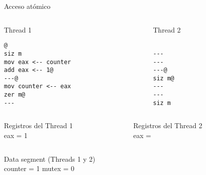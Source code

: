 \begin{frame}[fragile]{Acceso at\'omico}
   \begin{columns}
      \begin{column}{.5\linewidth}
          Thread 1
         \begin{lstlisting}[style=dimmided42,firstnumber=0]
         @
siz m
mov eax <-- counter
add eax <-- 1@
---@
mov counter <-- eax
zer m@
---
         \end{lstlisting}
      \end{column}
      \begin{column}{.45\linewidth}
          Thread 2
         \begin{lstlisting}[style=dimmided42,firstnumber=0]

---
---
---@
siz m@
---
---
siz m
         \end{lstlisting}
      \end{column}
   \end{columns}
    \vspace{0.8em}
   \begin{columns}
      \begin{column}{.5\linewidth}
          Registros del Thread 1\\
eax = 1
      \end{column}
      \begin{column}{.45\linewidth}
          Registros del Thread 2\\
eax = 
      \end{column}
   \end{columns}
    \vspace{1.4em}
    \centering
   \begin{columns}
      \begin{column}{.5\linewidth}
          Data segment (Threads 1 y 2)\\
          counter = 1  \hspace{0.6em}  mutex = 0
      \end{column}
   \end{columns}
\end{frame}

